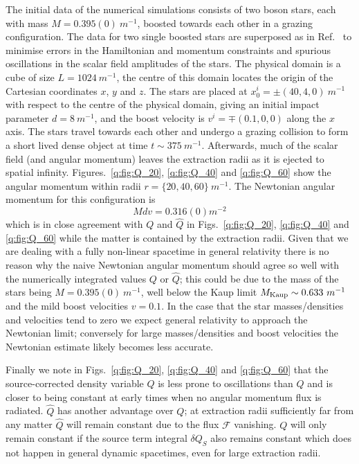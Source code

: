 The initial data of the numerical simulations consists of two boson stars, each with mass $M=0.395(0)~m^{-1}$, boosted towards each other in a grazing configuration. The data for two single boosted stars are superposed as in Ref.~\cite{helfer2021malaise} to minimise errors in the Hamiltonian and momentum constraints and spurious oscillations in the scalar field amplitudes of the stars. 
The physical domain is a cube of size $L=1024 ~m^{-1}$, the centre of this domain locates the origin of the Cartesian coordinates $x$, $y$ and $z$. The stars are placed at $x_0^i=\pm(40,4,0)~m^{-1}$ with respect to the centre of the physical domain, giving an initial impact parameter $d=8~m^{-1}$, and the boost velocity is $v^i=\mp(0.1,0,0)$ along the $x$ axis. The stars travel towards each other and undergo a grazing collision to form a short lived dense object at time $t \sim 375 ~m^{-1}$. Afterwards, much of the scalar field (and angular momentum) leaves the extraction radii as it is ejected to spatial infinity. Figures.~\ref{q:fig:Q_20}, \ref{q:fig:Q_40} and \ref{q:fig:Q_60} show the angular momentum within radii $r = \{20,40,60\}~m^{-1}$. The Newtonian angular momentum for this configuration is 
\begin{equation}\label{q:eq:newtQ}Mdv=0.316(0) m^{-2}\end{equation}
 which is in close agreement with $Q$ and $\hat{Q}$ in Figs.~\ref{q:fig:Q_20}, \ref{q:fig:Q_40} and \ref{q:fig:Q_60} while the matter is contained by the extraction radii. Given that we are dealing with a fully non-linear spacetime in general relativity there is no reason why the naive Newtonian angular momentum should agree so well with the numerically integrated values $Q$ or $\hat{Q}$; this could be due to the mass of the stars being $M=0.395(0) ~m^{-1}$, well below the Kaup limit $M_{\rm{Kaup}} \sim 0.633 ~m^{-1}$ and the mild boost velocities $v=0.1$. In the case that the star masses/densities and velocities tend to zero we expect general relativity to approach the Newtonian limit; conversely for large masses/densities and boost velocities the Newtonian estimate likely becomes less accurate. 

 Finally we note in Figs.~\ref{q:fig:Q_20}, \ref{q:fig:Q_40} and \ref{q:fig:Q_60} that the source-corrected density variable $\hat{Q}$ is less prone to oscillations than $Q$ and is closer to being constant at early times when no angular momentum flux is radiated. $\hat{Q}$ has another advantage over $Q$; at extraction radii sufficiently far from any matter $\hat{Q}$ will remain constant due to the flux $\mathcal{F}$ vanishing. $Q$ will only remain constant if the source term integral $\delta Q_S$ also remains constant which does not happen in general dynamic spacetimes, even for large extraction radii.






